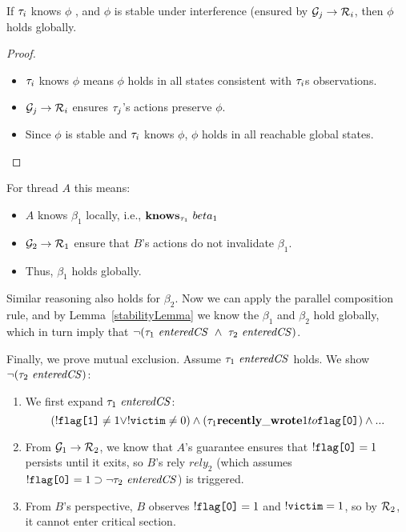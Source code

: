 \begin{lemma}\label{stabilityLemma} If $\tau_i$ knows $\phi$ , and $\phi$ is stable under interference (ensured by $\mathcal{G}_j \rightarrow \mathcal{R}_i$, then $\phi$ holds globally.
\end{lemma}
\begin{proof}
\begin{itemize}
    \item $\tau_i$  knows $\phi$ means $\phi$ holds in all states consistent with $\tau_i$s observations.
    \item $\mathcal{G}_j \rightarrow \mathcal{R}_i$ ensures $\tau_j$'s actions preserve $\phi$.
    \item Since $\phi$ is stable and $\tau_i$ knows $\phi$, $\phi$ holds in all reachable global states.
\end{itemize}
\end{proof}

For thread $A$ this means:
\begin{itemize}
    \item $A$ knows $\beta_1$ locally, i.e., $\Knows_{\tid_1}\ beta_1$
    \item $\mathcal{G}_2 \rightarrow \mathcal{R}_1$ ensure that $B$'s actions do not invalidate $\beta_1$.
    \item Thus, $\beta_1$ holds globally.
\end{itemize}
Similar reasoning also holds for $\beta_2$.
%
Now we can apply the parallel composition rule, and by Lemma~\ref{stabilityLemma} we know the $\beta_1$ and $\beta_2$ hold globally, which in turn imply that $\neg (\tau_1\  \mathit{enteredCS}\  \wedge\ \tau_2\  \mathit{enteredCS})$.

Finally, we prove mutual exclusion. Assume $\tau_1\  \mathit{enteredCS}$ holds. We show $\neg(\tau_2\  \mathit{enteredCS})$:
\begin{enumerate}
    \item We first expand $\tau_1\  \mathit{enteredCS}$:
     \[
     (!\texttt{flag[1]} \neq 1 \vee !\texttt{victim} \neq 0) \wedge (\tau_1 \mathbf{recently\_wrote} 1 to \texttt{flag[0]}) \wedge ...
     \]
     \item From $\mathcal{G}_1 \rightarrow \mathcal{R}_2$, we know that $A$'s guarantee ensures that $!\texttt{flag[0]} = 1$  persists until it exits, so $B$'s rely $rely_2$ (which assumes $!\texttt{flag[0]} = 1 \supset \neg \tau_2\  \mathit{enteredCS}$) is triggered.
     \item From $B$'s perspective, $B$ observes $!\texttt{flag[0]} = 1$ and $!\texttt{victim} = 1$, so by $\mathcal{R}_2$, it cannot enter critical section.
\end{enumerate}

